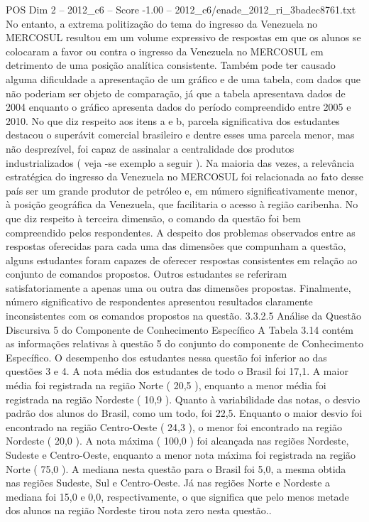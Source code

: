 \begin{textsample}{POS Dim 2 – 2012\_c6 – Score -1.00 – 2012\_c6/enade\_2012\_ri\_3badec8761.txt}
No entanto, a extrema politização do tema do ingresso da Venezuela no MERCOSUL resultou em um volume expressivo de respostas em que os alunos se colocaram a favor ou contra o ingresso da Venezuela no MERCOSUL em detrimento de uma posição analítica consistente.
Também pode ter causado alguma dificuldade a apresentação de um gráfico e de uma tabela, com dados que não poderiam ser objeto de comparação, já que a tabela apresentava dados de 2004 enquanto o gráfico apresenta dados do período compreendido entre 2005 e 2010.
No que diz respeito aos itens a e b, parcela significativa dos estudantes destacou o superávit comercial brasileiro e dentre esses uma parcela menor, mas não desprezível, foi capaz de assinalar a centralidade dos produtos industrializados ( veja -se exemplo a seguir ).
Na maioria das vezes, a relevância estratégica do ingresso da Venezuela no MERCOSUL foi relacionada ao fato desse país ser um grande produtor de petróleo e, em número significativamente menor, à posição geográfica da Venezuela, que facilitaria o acesso à região caribenha.
No que diz respeito à terceira dimensão, o comando da questão foi bem compreendido pelos respondentes.
A despeito dos problemas observados entre as respostas oferecidas para cada uma das dimensões que compunham a questão, alguns estudantes foram capazes de oferecer respostas consistentes em relação ao conjunto de comandos propostos.
Outros estudantes se referiram satisfatoriamente a apenas uma ou outra das dimensões propostas.
Finalmente, número significativo de respondentes apresentou resultados claramente inconsistentes com os comandos propostos na questão. 3.3.2.5 Análise da Questão Discursiva 5 do Componente de Conhecimento Específico A Tabela 3.14 contém as informações relativas à questão 5 do conjunto do componente de Conhecimento Específico.
O desempenho dos estudantes nessa questão foi inferior ao das questões 3 e 4.
A nota média dos estudantes de todo o Brasil foi 17,1.
A maior média foi registrada na região Norte ( 20,5 ), enquanto a menor média foi registrada na região Nordeste ( 10,9 ).
Quanto à variabilidade das notas, o desvio padrão dos alunos do Brasil, como um todo, foi 22,5.
Enquanto o maior desvio foi encontrado na região Centro-Oeste ( 24,3 ), o menor foi encontrado na região Nordeste ( 20,0 ).
A nota máxima ( 100,0 ) foi alcançada nas regiões Nordeste, Sudeste e Centro-Oeste, enquanto a menor nota máxima foi registrada na região Norte ( 75,0 ).
A mediana nesta questão para o Brasil foi 5,0, a mesma obtida nas regiões Sudeste, Sul e Centro-Oeste.
Já nas regiões Norte e Nordeste a mediana foi 15,0 e 0,0, respectivamente, o que significa que pelo menos metade dos alunos na região Nordeste tirou nota zero nesta questão..

\end{textsample}
